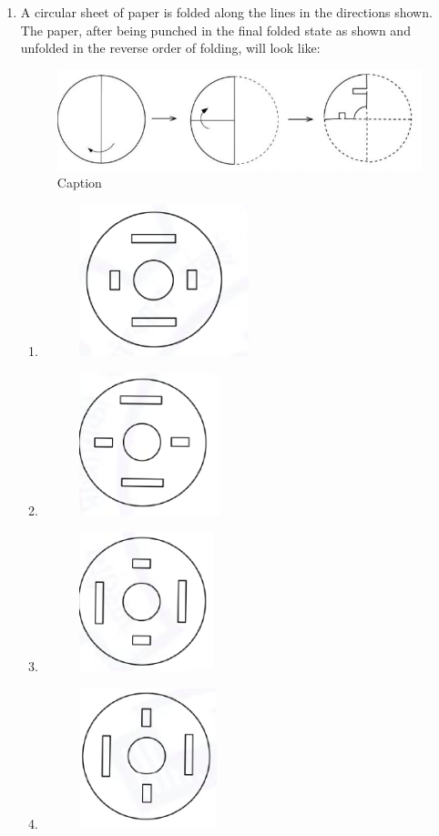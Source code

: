 \documentclass[journal,12pt,onecolumn]{IEEEtran}
\theoremstyle{remark}
\begin{document}
\begin{enumerate}[start=1, label=Q.\arabic*]
\item A circular sheet of paper is folded along the lines in the directions shown.  
The paper, after being punched in the final folded state as shown and unfolded in the reverse order of folding, will look like:
\begin{figure}
    \centering
    \includegraphics[width=0.5\columnwidth]{Figures/qn4.png}
    \caption{Caption}
\end{figure}
\begin{enumerate}
\item \begin{figure}[H]\includegraphics[width=0.25\columnwidth]{Figures/qn4a.png}\caption*{}\end{figure}
\item \begin{figure}[H]\includegraphics[width=0.25\columnwidth]{Figures/qn4b.png}\caption*{}\end{figure}
\item \begin{figure}[H]\includegraphics[width=0.25\columnwidth]{Figures/qn4c.png}\caption*{}\end{figure}
\item \begin{figure}[H]\includegraphics[width=0.25\columnwidth]{Figures/qn4d.png}\caption*{}\end{figure}
\end{enumerate}


\end{enumerate}
\end{document}

